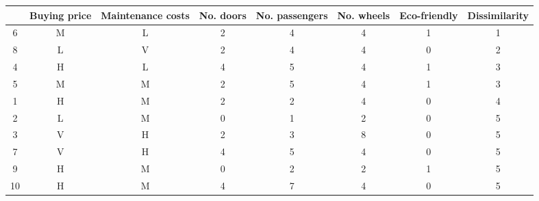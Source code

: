 \begin{tabular}{cccccccc}
\toprule
{} & Buying price & Maintenance costs &  No. doors &  No. passengers &  No. wheels &  Eco-friendly &  Dissimilarity \\
\midrule
6  &            M &                 L &          2 &               4 &           4 &             1 &              1 \\
8  &            L &                 V &          2 &               4 &           4 &             0 &              2 \\
4  &            H &                 L &          4 &               5 &           4 &             1 &              3 \\
5  &            M &                 M &          2 &               5 &           4 &             1 &              3 \\
1  &            H &                 M &          2 &               2 &           4 &             0 &              4 \\
2  &            L &                 M &          0 &               1 &           2 &             0 &              5 \\
3  &            V &                 H &          2 &               3 &           8 &             0 &              5 \\
7  &            V &                 H &          4 &               5 &           4 &             0 &              5 \\
9  &            H &                 M &          0 &               2 &           2 &             1 &              5 \\
10 &            H &                 M &          4 &               7 &           4 &             0 &              5 \\
\bottomrule
\end{tabular}
